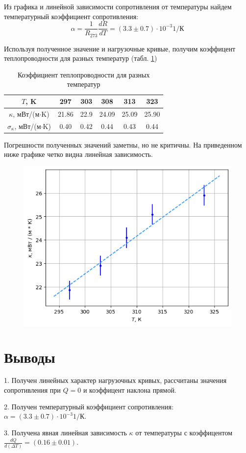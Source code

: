 \documentclass[a4paper,12pt]{article} %
\begin{document}
Из графика и линейной зависимости сопротивления от температуры найдем температурный коэффициент сопротивления:
\begin{equation}
	\alpha=\frac{1}{R_{273}}\frac{dR}{dT}=(3.3 \pm 0.7)\cdot 10^{-3}  1/К
\end{equation}

Используя полученное значение и нагрузочные кривые, получим коэффицент теплопроводности для разных температур (табл. \ref{кси})

\begin{table}[H]
	\caption{Коэффициент теплопроводности для разных температур}
	\label{кси}
	\begin{tabular}{|c|c|c|c|c|c|}
		\hline
		$T$, K                     & 297   & 303   & 308   & 313 & 323   \\ \hline
		$\kappa$, мВт/(м$\cdot$K)        & 21.86 & 22.9 & 24.09 & 25.09 & 25.90 \\ \hline
		$\sigma_\kappa$, мВт/(м$\cdot$K) & 0.40 & 0.42 & 0.44 & 0.43 & 0.44 \\ \hline
	\end{tabular}
\end{table}

Погрешности полученных значений заметны, но не критичны. На приведенном ниже графике четко видна линейная зависимость.

\begin{figure}[H]
	\begin{center}
		\includegraphics[width=\textwidth]{kappa.png}\end{center}
\end{figure}

\section{Выводы}

\hspace{5mm}
1. Получен линейных характер нагрузочных кривых, рассчитаны значения сопротивления при $Q=0$ и коэффицент наклона прямой.

2. Получен температурный коэффициент сопротивления: $\alpha=(3.3 \pm 0.7)\cdot 10^{-3}  1/К$.

3. Получена явная линейная зависимость $\kappa$ от температуры с коэффицентом $\frac{dQ}{d(\Delta T)} = (0.16 \pm 0.01)$.
\end{document}
